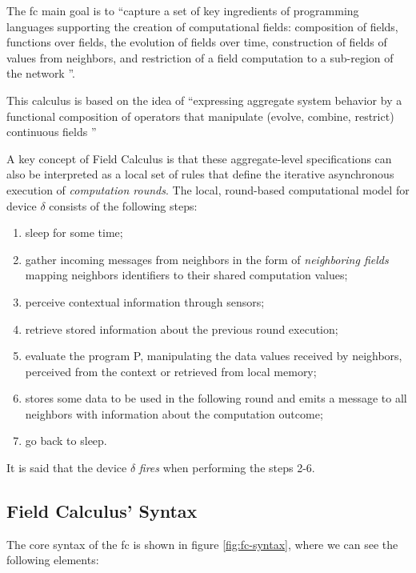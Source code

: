 The \ac{fc} main goal is to ``capture a set of key ingredients of programming languages supporting the creation of computational fields: composition of fields, functions
over fields, the evolution of fields over time, construction of fields of values from neighbors, and restriction of a field computation to a sub-region of the network \cite{10.1007/978-3-642-45364-9_11}''.

This calculus is based on the idea of ``expressing aggregate system behavior by a functional composition of operators that manipulate (evolve, combine, restrict) continuous fields \cite{10.1007/978-3-642-45364-9_11}''

A key concept of Field Calculus is that these aggregate-level specifications can also be interpreted as a local set of rules that define the iterative asynchronous execution of \textit{computation rounds}.
The local, round-based computational model for device $\delta$ consists of the following steps:

\begin{enumerate}
    \item sleep for some time;
    \item gather incoming messages from neighbors in the form of \textit{neighboring fields} mapping neighbors identifiers to their shared computation values;
    \item perceive contextual information through sensors;
    \item retrieve stored information about the previous round execution;
    \item evaluate the program P, manipulating the data values received by neighbors, perceived from the context or retrieved from local memory;
    \item stores some data to be used in the following round and emits a message to all neighbors with information about the computation outcome;
    \item go back to sleep.
\end{enumerate}

It is said that the device $\delta$ \textit{fires} when performing the steps 2-6.

\subsection{Field Calculus' Syntax}
\label{subsec:fc-syntax}
The core syntax of the \ac{fc} is shown in figure \ref{fig:fc-syntax}, where we can see the following elements:

